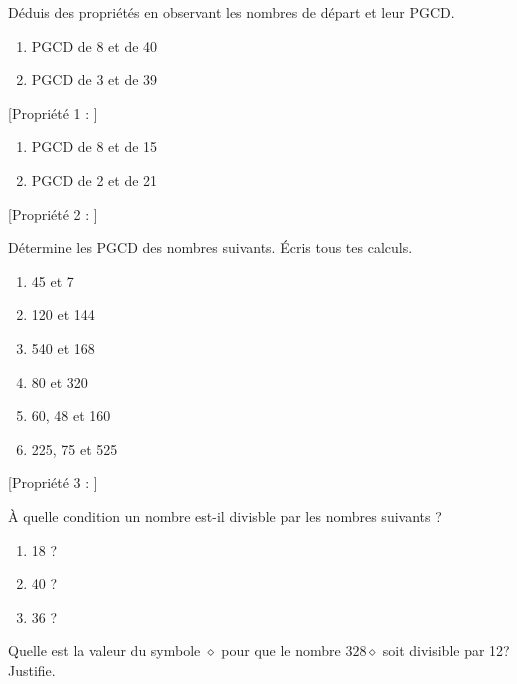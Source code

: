 \documentclass[../../syllabus_2.tex]{subfiles}
\begin{document}
Déduis des propriétés en observant les nombres de départ et leur PGCD.

\begin{enumerate}[cols=2]
    \item PGCD de 8 et de 40
    \item PGCD de 3 et de 39
\end{enumerate}
\vfill
{}[Propriété 1 : ]

\begin{enumerate}[cols=2]
    \item PGCD de 8 et de 15
    \item PGCD de 2 et de 21
\end{enumerate}
\vfill
{}[Propriété 2 : ]

\newpage

\begin{exercise}
    Détermine les PGCD des nombres suivants. Écris tous tes calculs.
    \begin{enumerate}[cols=2, itemsep= 5.7cm]
        \item 45 et 7
        \item 120 et 144
        \item 540 et 168
        \item 80 et 320
        \item 60, 48 et 160
        \item 225, 75 et 525
    \end{enumerate}
    \vspace{5cm}
\end{exercise}

[Propriété 3 : ]%

\begin{exercise}
    À quelle condition un nombre est-il divisble par les nombres suivants ?
    \begin{enumerate}
        \item 18 ? 
        \item 40 ? 
        \item 36 ? 
    \end{enumerate}
\end{exercise}

\begin{exercise}
    Quelle est la valeur du symbole $\diamond$  pour que le nombre $328\diamond$  soit divisible par 12? Justifie.
\end{exercise}
\end{document}
